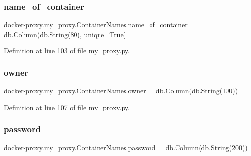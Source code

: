 \subsubsection{\texorpdfstring{name\+\_\+of\+\_\+container}{name\_of\_container}}
{\footnotesize\ttfamily docker-\/proxy.\+my\+\_\+proxy.\+Container\+Names.\+name\+\_\+of\+\_\+container = db.\+Column(db.\+String(80), unique=True)\hspace{0.3cm}{\ttfamily [static]}}



Definition at line 103 of file my\+\_\+proxy.\+py.

\hypertarget{classdocker-proxy_1_1my__proxy_1_1_container_names_a18b80021fc434e7dac00f009f7a451b5}{}\label{classdocker-proxy_1_1my__proxy_1_1_container_names_a18b80021fc434e7dac00f009f7a451b5} 
\subsubsection{\texorpdfstring{owner}{owner}}
{\footnotesize\ttfamily docker-\/proxy.\+my\+\_\+proxy.\+Container\+Names.\+owner = db.\+Column(db.\+String(100))\hspace{0.3cm}{\ttfamily [static]}}



Definition at line 107 of file my\+\_\+proxy.\+py.

\hypertarget{classdocker-proxy_1_1my__proxy_1_1_container_names_a5728904cb244540aa3421e07dc14cc84}{}\label{classdocker-proxy_1_1my__proxy_1_1_container_names_a5728904cb244540aa3421e07dc14cc84} 
\subsubsection{\texorpdfstring{password}{password}}
{\footnotesize\ttfamily docker-\/proxy.\+my\+\_\+proxy.\+Container\+Names.\+password = db.\+Column(db.\+String(200))\hspace{0.3cm}{\ttfamily [static]}}



